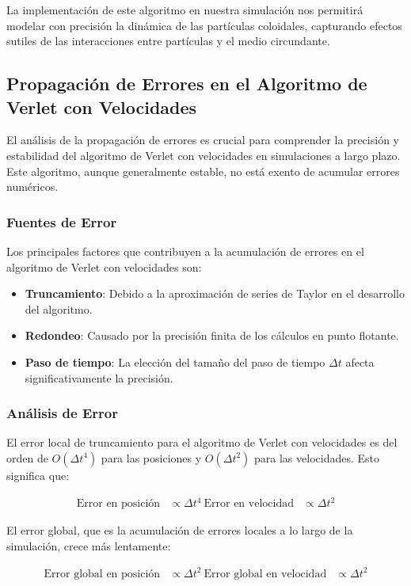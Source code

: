 \documentclass[twocolumn]{article}
\begin{document}
La implementación de este algoritmo en nuestra simulación nos permitirá modelar con precisión la dinámica de las partículas coloidales, capturando efectos sutiles de las interacciones entre partículas y el medio circundante.
\subsection*{Propagación de Errores en el Algoritmo de Verlet con Velocidades}
El análisis de la propagación de errores es crucial para comprender la precisión y estabilidad del algoritmo de Verlet con velocidades en simulaciones a largo plazo. Este algoritmo, aunque generalmente estable, no está exento de acumular errores numéricos.

\subsubsection*{Fuentes de Error}
Los principales factores que contribuyen a la acumulación de errores en el algoritmo de Verlet con velocidades son:

\begin{itemize}
    \item \textbf{Truncamiento}: Debido a la aproximación de series de Taylor en el desarrollo del algoritmo.
    \item \textbf{Redondeo}: Causado por la precisión finita de los cálculos en punto flotante.
    \item \textbf{Paso de tiempo}: La elección del tamaño del paso de tiempo $\Delta t$ afecta significativamente la precisión.
\end{itemize}

\subsubsection*{Análisis de Error}
El error local de truncamiento para el algoritmo de Verlet con velocidades es del orden de $O(\Delta t^4)$ para las posiciones y $O(\Delta t^2)$ para las velocidades. Esto significa que:

\begin{align}
    \text{Error en posición} &\propto \Delta t^4 \
    \text{Error en velocidad} &\propto \Delta t^2
\end{align}

El error global, que es la acumulación de errores locales a lo largo de la simulación, crece más lentamente:

\begin{align}
    \text{Error global en posición} &\propto \Delta t^2 \
    \text{Error global en velocidad} &\propto \Delta t^2
\end{align}
\end{document}
